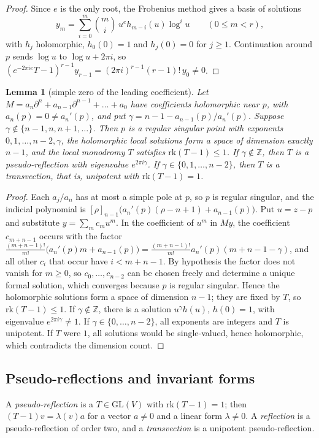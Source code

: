 \documentclass[11pt]{amsart}
\newtheorem{lemma}[thm]{Lemma}
\theoremstyle{definition}
\newcommand{\Z}{\mathbb Z}
\newcommand{\GL}{\mathrm{GL}}
\newcommand{\rk}{\mathrm{rk}}
\newcommand{\ff}[2]{[#1]_{#2}}
\begin{document}
\begin{proof}
Since $e$ is the only root, the Frobenius method \cite{Inc56} gives a basis of solutions
\[
y_m=\sum_{i=0}^m\binom mi\,u^eh_{m-i}(u)\log^iu\qquad(0\le m<r),
\]
with $h_j$ holomorphic, $h_0(0)=1$ and $h_j(0)=0$ for $j\ge1$. Continuation around $p$ sends $\log u$ to $\log u+2\pi i$, so $(e^{-2\pi ie}T-1)^{r-1}y_{r-1}=(2\pi i)^{r-1}(r-1)!\,y_0\neq0$.
\end{proof}

\begin{lemma}[simple zero of the leading coefficient]\label{lem:simplezero}
Let $M=a_n\partial^n+a_{n-1}\partial^{n-1}+\dots+a_0$ have coefficients holomorphic near $p$, with $a_n(p)=0\ne a_n'(p)$, and put $\gamma=n-1-a_{n-1}(p)/a_n'(p)$. Suppose $\gamma\notin\{n-1,n,n+1,\dots\}$. Then $p$ is a regular singular point with exponents $0,1,\dots,n-2,\gamma$, the holomorphic local solutions form a space of dimension exactly $n-1$, and the local monodromy $T$ satisfies $\rk(T-1)\le1$. If $\gamma\notin\Z$, then $T$ is a pseudo-reflection with eigenvalue $e^{2\pi i\gamma}$. If $\gamma\in\{0,1,\dots,n-2\}$, then $T$ is a transvection, that is, unipotent with $\rk(T-1)=1$.
\end{lemma}

\begin{proof}
Each $a_j/a_n$ has at most a simple pole at $p$, so $p$ is regular singular, and the indicial polynomial is $\ff\rho{n-1}\bigl(a_n'(p)(\rho-n+1)+a_{n-1}(p)\bigr)$. Put $u=z-p$ and substitute $y=\sum_mc_mu^m$. In the coefficient of $u^m$ in $My$, the coefficient $c_{m+n-1}$ occurs with the factor $\frac{(m+n-1)!}{m!}\bigl(a_n'(p)m+a_{n-1}(p)\bigr)=\frac{(m+n-1)!}{m!}a_n'(p)(m+n-1-\gamma)$, and all other $c_i$ that occur have $i<m+n-1$. By hypothesis the factor does not vanish for $m\ge0$, so $c_0,\dots,c_{n-2}$ can be chosen freely and determine a unique formal solution, which converges because $p$ is regular singular. Hence the holomorphic solutions form a space of dimension $n-1$; they are fixed by $T$, so $\rk(T-1)\le1$. If $\gamma\notin\Z$, there is a solution $u^\gamma h(u)$, $h(0)=1$, with eigenvalue $e^{2\pi i\gamma}\ne1$. If $\gamma\in\{0,\dots,n-2\}$, all exponents are integers and $T$ is unipotent. If $T$ were $1$, all solutions would be single-valued, hence holomorphic, which contradicts the dimension count.
\end{proof}

\subsection{Pseudo-reflections and invariant forms}
A \emph{pseudo-reflection} is a $T\in\GL(V)$ with $\rk(T-1)=1$; then $(T-1)v=\lambda(v)a$ for a vector $a\ne0$ and a linear form $\lambda\neq0$. A \emph{reflection} is a pseudo-reflection of order two, and a \emph{transvection} is a unipotent pseudo-reflection.
\end{document}
